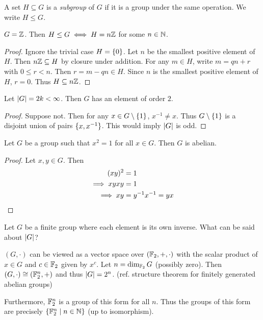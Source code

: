 \begin{definition}[Subgroup] \label{def:group:sub}
    A set $H \subseteq G$ is a \emph{subgroup} of $G$ if it is a group
    under the same operation.
    We write $H \le G$.
\end{definition}
\begin{examples}
    \item $G = \mathbb{Z}$. Then $H \le G \iff H = n\mathbb{Z}$ for some $n \in \mathbb{N}$.
    \begin{proof}
        Ignore the trivial case $H = \{0\}$.
        Let $n$ be the smallest positive element of $H$.
        Then $n\mathbb{Z} \subseteq H$ by closure under addition.
        For any $m \in H$, write $m = qn + r$ with $0 \le r < n$.
        Then $r = m - qn \in H$.
        Since $n$ is the smallest positive element of $H$, $r = 0$.
        Thus $H \subseteq n\mathbb{Z}$.
    \end{proof}
    \item Let $\lvert G\rvert = 2k < \infty$.
    Then $G$ has an element of order $2$.
    \begin{proof}
        Suppose not.
        Then for any $x \in G \setminus \{1\}$, $x^{-1} \ne x$.
        Thus $G \setminus \{1\}$ is a disjoint union of pairs
        $\{x, x^{-1}\}$.
        This would imply $\lvert G\rvert$ is odd.
    \end{proof}
    \item Let $G$ be a group such that $x^2 = 1$ for all $x \in G$.
    Then $G$ is abelian.
    \begin{proof}
        Let $x, y \in G$.
        Then \begin{align*}
            (xy)^2 &= 1 \\
            \implies xyxy &= 1 \\
            \implies xy &= y^{-1} x^{-1} = yx \qedhere
        \end{align*}
    \end{proof}
    \item Let $G$ be a finite group where each element is its own inverse.
    What can be said about $\lvert G\rvert$?

    $(G, \cdot)$ can be viewed as a vector space over $(\mathbb{F}_2, +, \cdot)$
    with the scalar product of $x \in G$ and $c \in \mathbb{F}_2$ given by
    $x^c$.
    Let $n = \dim_{\mathbb{F}_2} G$ (possibly zero).
    Then $(G, \cdot) \cong (\mathbb{F}_2^n, +)$ and thus $\lvert G\rvert = 2^n$.
    (ref. structure theorem for finitely generated abelian groups)

    Furthermore, $\mathbb{F}_2^n$ is a group of this form for all $n$.
    Thus the groups of this form are precisely $\{\mathbb{F}_2^n \mid n \in \mathbb{N}\}$
    (up to isomorphism).
\end{examples}

